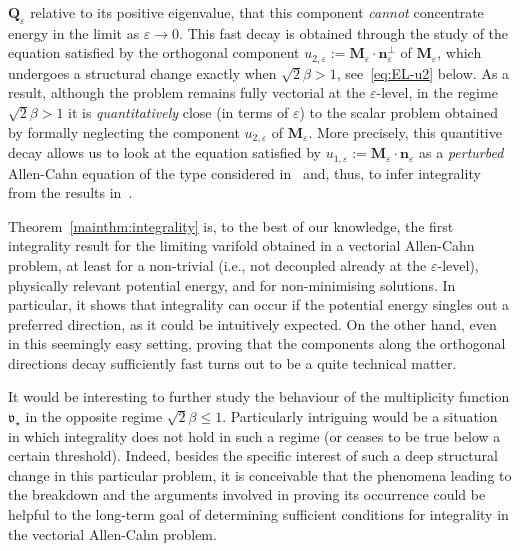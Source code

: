 \documentclass[a4paper, 11pt, twoside, leqno]{article}
\theoremstyle{definition}              %
\theoremstyle{remark}                  %
\newcommand{\Q}{\mathbf{Q}}
\newcommand{\M}{\mathbf{M}}
\newcommand{\n}{\mathbf{n}}
\newcommand{\eps}{\varepsilon}
\begin{document}
$\Q_\eps$ relative to its positive eigenvalue, that this component \emph{cannot} concentrate energy in the 
limit as $\eps \to 0$. 
This fast decay is obtained through the study of the equation satisfied by the orthogonal 
component $u_{2,\eps} := \M_\eps \cdot \n^{\perp}_\eps$ of $\M_\eps$, 
which undergoes a structural change exactly 
when $\sqrt{2}\beta > 1$, see~\eqref{eq:EL-u2} below.   
As a result, 
although the problem remains fully vectorial at the $\eps$-level, 
in the regime $\sqrt{2}\beta > 1$ it is \emph{quantitatively} close (in terms 
of $\eps$) to the  
scalar problem obtained by formally neglecting the component 
$u_{2,\eps}$ of $\M_\eps$. 
More precisely, this quantitive decay %
allows us to look at the equation satisfied by   
$u_{1,\eps} := \M_\eps \cdot \n_\eps$ as a \emph{perturbed} Allen-Cahn equation of 
the type considered in~\cite{NagaseTonegawa} and, thus, to infer integrality from the 
results in~\cite{NagaseTonegawa}.

Theorem~\ref{mainthm:integrality} is, to the best of our knowledge, the first 
integrality result for the limiting varifold obtained in a vectorial Allen-Cahn problem, 
at least for a non-trivial (i.e., not decoupled already at the $\eps$-level), 
physically relevant potential energy, and for non-minimising solutions. 
In particular, it shows that integrality can occur 
if the potential energy singles out a preferred direction, as it could be 
intuitively expected. On the other 
hand, even in this seemingly easy setting, 
proving that the components along the orthogonal directions decay sufficiently 
fast turns out to be a quite technical matter. 

It would be 
interesting to further study the behaviour of the multiplicity function 
$\mathfrak{v}_\star$ in the opposite regime $\sqrt{2}\beta \leq 1$. 
Particularly 
intriguing would be a situation in which integrality does not hold in such a regime 
(or ceases to be true below a certain threshold). 
Indeed, besides the specific interest of such a deep structural change in this 
particular problem, it is conceivable that the phenomena leading to the breakdown 
and the arguments involved in proving its occurrence 
could be helpful to the long-term goal of determining  
sufficient conditions for integrality in the vectorial Allen-Cahn problem. 
\end{document}
